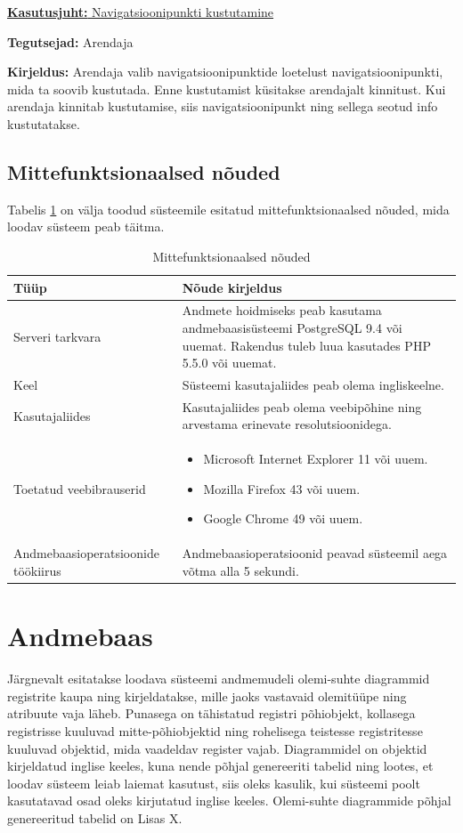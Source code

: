 \documentclass[a4paper,12pt]{article} %
\begin{document}
\underline{\textbf{Kasutusjuht:} Navigatsioonipunkti kustutamine}
\par
\textbf{Tegutsejad:} Arendaja
\par
\textbf{Kirjeldus:} Arendaja valib navigatsioonipunktide loetelust navigatsioonipunkti, mida ta soovib kustutada. Enne kustutamist küsitakse arendajalt kinnitust. Kui arendaja kinnitab kustutamise, siis navigatsioonipunkt ning sellega seotud info kustutatakse.
\par

\subsection{Mittefunktsionaalsed nõuded}
Tabelis \ref{mittefunktsionaalsed_nõuded} on välja toodud süsteemile esitatud mittefunktsionaalsed nõuded, mida loodav süsteem peab täitma.
\begin{table}[H]%
\begin{center}
\caption{Mittefunktsionaalsed nõuded}
\label{mittefunktsionaalsed_nõuded}
\begin{tabular}{|p{5cm}|p{10cm}|}
\hline
\rowcolor{rowgray}
Tüüp & Nõude kirjeldus \\ \hline
Serveri tarkvara & Andmete hoidmiseks peab kasutama andmebaasisüsteemi PostgreSQL 9.4 või uuemat. Rakendus tuleb luua kasutades PHP 5.5.0 või uuemat. \\ \hline
Keel & Süsteemi kasutajaliides peab olema ingliskeelne. \\ \hline
Kasutajaliides & Kasutajaliides peab olema veebipõhine ning arvestama erinevate resolutsioonidega. \\ \hline
Toetatud veebibrauserid & 
\begin{itemize}
\item Microsoft Internet Explorer 11 või uuem.
\item Mozilla Firefox 43 või uuem.
\item Google Chrome 49 või uuem.
\end{itemize}
 \\ \hline
Andmebaasioperatsioonide töökiirus & Andmebaasioperatsioonid peavad süsteemil aega võtma alla 5 sekundi. \\ \hline
\end{tabular}
\end{center}
\end{table}

\section{Andmebaas}
Järgnevalt esitatakse loodava süsteemi andmemudeli olemi-suhte diagrammid registrite kaupa ning kirjeldatakse, mille jaoks vastavaid olemitüüpe ning atribuute vaja läheb. Punasega on tähistatud registri põhiobjekt, kollasega registrisse kuuluvad mitte-põhiobjektid ning rohelisega teistesse registritesse kuuluvad objektid, mida vaadeldav register vajab. Diagrammidel on objektid kirjeldatud inglise keeles, kuna nende põhjal genereeriti tabelid ning lootes, et loodav süsteem leiab laiemat kasutust, siis oleks kasulik, kui süsteemi poolt kasutatavad osad oleks kirjutatud inglise keeles. Olemi-suhte diagrammide põhjal genereeritud tabelid on Lisas X.
\end{document}
